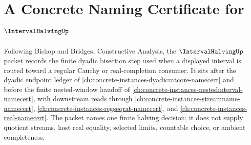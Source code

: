 \chapter{A Concrete Naming Certificate for $\IntervalHalvingUp$}
\label{ch:concrete-instances-intervalhalving-namecert}

Following Bishop and Bridges, Constructive Analysis, the $\IntervalHalvingUp$ packet records the finite dyadic bisection step used when a displayed interval is routed toward a regular Cauchy or real-completion consumer. It sits after the dyadic endpoint ledger of \autoref{ch:concrete-instances-dyadicratcore-namecert} and before the finite nested-window handoff of \autoref{ch:concrete-instances-nestedinterval-namecert}, with downstream reads through \autoref{ch:concrete-instances-streamname-namecert}, \autoref{ch:concrete-instances-regseqrat-namecert}, and \autoref{ch:concrete-instances-real-namecert}. The packet names one finite halving decision; it does not supply quotient streams, host real equality, selected limits, countable choice, or ambient completeness.

